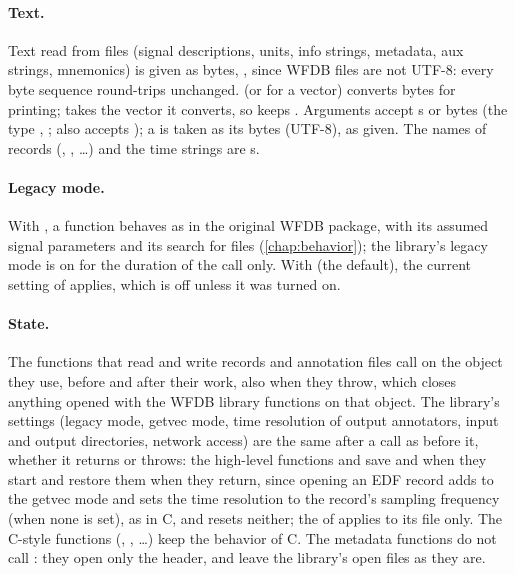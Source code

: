 \paragraph{Text.} Text read from files (signal descriptions, units, info strings,
metadata, aux strings, mnemonics) is given as bytes, , since WFDB
files are not UTF-8: every byte sequence round-trips unchanged.  (or
 for a vector) converts bytes for printing;  takes the
vector it converts, so  keeps . Arguments accept
s or bytes (the type , ;  also accepts ); a
 is taken as its bytes (UTF-8), as given. The names of records
(, , \ldots) and the time strings are s.

\paragraph{Legacy mode.} With , a function behaves as in the original
WFDB package, with its assumed signal parameters and its search for files
(\cref{chap:behavior}); the library's legacy mode is on for the duration of the call
only. With  (the default), the current setting of 
applies, which is off unless it was turned on.

\paragraph{State.} The functions that read and write records and annotation files call
 on the  object they use, before and after their work, also
when they throw, which closes anything opened with the WFDB library functions on that
object. The library's settings (legacy mode, getvec mode, time resolution of output
annotators, input and output directories, network access) are the same after a call as
before it, whether it returns or throws: the high-level functions and
 save  and  when they start and
restore them when they return, since opening an EDF record adds  to
the getvec mode and sets the time resolution to the record's sampling frequency (when
none is set), as in C, and  resets neither; the  of
 applies to its file only. The C-style functions
(, , \ldots) keep the behavior of C. The metadata
functions do not call : they open only the header, and leave the
library's open files as they are.

